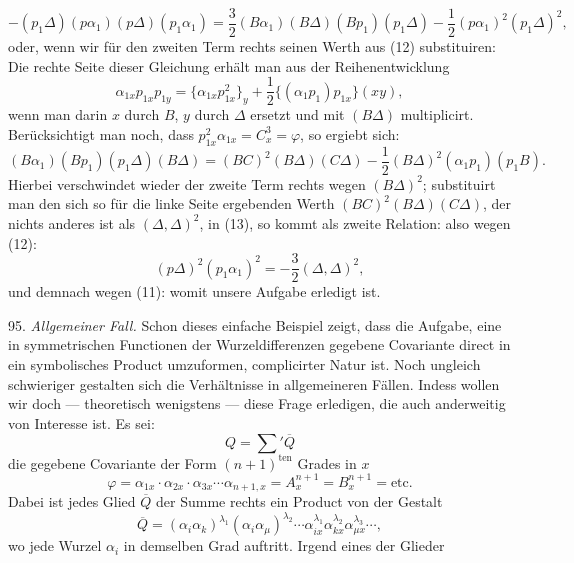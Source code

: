 \[
-(p_1\Delta)(p\alpha_1)(p\Delta)(p_1\alpha_1) = \frac{3}{2}(B\alpha_1)(B\Delta)(Bp_1)(p_1\Delta) - \frac{1}{2}(p\alpha_1)^2(p_1\Delta)^2,
\]
oder, wenn wir für den zweiten Term rechts seinen Werth aus (12)
substituiren:
Die rechte Seite dieser Gleichung erhält man aus der Reihenentwicklung
\[
\alpha_{1x}p_{1x}p_{1y} = \{\alpha_{1x}p_{1x}^2\}_y + \frac{1}{2}\{(\alpha_1p_1)p_{1x}\}(xy),
\]
wenn man darin $x$ durch $B$, $y$ durch $\Delta$ ersetzt und mit $(B\Delta)$ multiplicirt. Berücksichtigt man noch, dass $p_{1x}^2\alpha_{1x} = C_x^3 = \varphi$, so ergiebt sich:
\[
(B\alpha_1)(Bp_1)(p_1\Delta)(B\Delta) = (BC)^2(B\Delta)(C\Delta) - \frac{1}{2}(B\Delta)^2(\alpha_1p_1)(p_1B).
\]
Hierbei verschwindet wieder der zweite Term rechts wegen $(B\Delta)^2$; substituirt man den sich so für die linke Seite ergebenden Werth $(BC)^2(B\Delta)(C\Delta)$, der nichts anderes ist als $(\Delta,\Delta)^2$, in (13), so kommt als zweite Relation:
also wegen (12):
\[
(p\Delta)^2(p_1\alpha_1)^2 = -\frac{3}{2}(\Delta,\Delta)^2,
\]
und demnach wegen (11):
womit unsere Aufgabe erledigt ist.

95. \textit{Allgemeiner Fall.} Schon dieses einfache Beispiel zeigt, dass die Aufgabe, eine in symmetrischen Functionen der Wurzeldifferenzen gegebene Covariante direct in ein symbolisches Product umzuformen, complicirter Natur ist. Noch ungleich schwieriger gestalten sich die Verhältnisse in allgemeineren Fällen. Indess wollen wir doch --- theoretisch wenigstens --- diese Frage erledigen, die auch anderweitig von Interesse ist. Es sei:
\[
Q = \sum{}' \overline{Q}
\]
die gegebene Covariante der Form $(n+1)^{\text{ten}}$ Grades in $x$
\[
\varphi = \alpha_{1x}\cdot\alpha_{2x}\cdot\alpha_{3x}\cdots\alpha_{n+1,x} = A_x^{n+1} = B_x^{n+1} = \text{etc.}
\]
Dabei ist jedes Glied $\overline{Q}$ der Summe rechts ein Product von der Gestalt
\[
\overline{Q} = (\alpha_i\alpha_k)^{\lambda_1}(\alpha_i\alpha_\mu)^{\lambda_2}\cdots\alpha_{ix}^{\lambda_1}\alpha_{kx}^{\lambda_2}\alpha_{\mu x}^{\lambda_3}\cdots,
\]
wo jede Wurzel $\alpha_i$ in demselben Grad auftritt. Irgend eines der Glieder


